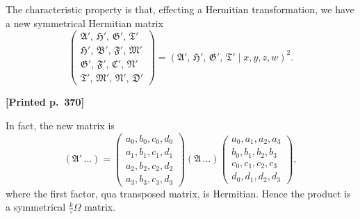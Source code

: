 \documentclass[11pt]{article}
\begin{document}
The characteristic property is that, effecting a Hermitian transformation, we have a new symmetrical Hermitian matrix
\[
\begin{pmatrix}\mathfrak{A}',\,\mathfrak{H}',\,\mathfrak{G}',\,\mathfrak{T}'\\ \mathfrak{H}',\,\mathfrak{B}',\,\mathfrak{F}',\,\mathfrak{M}'\\ \mathfrak{G}',\,\mathfrak{F}',\,\mathfrak{C}',\,\mathfrak{N}'\\ \mathfrak{T}',\,\mathfrak{M}',\,\mathfrak{N}',\,\mathfrak{D}'\end{pmatrix}
=(\mathfrak{A}',\,\mathfrak{H}',\,\mathfrak{G}',\,\mathfrak{T}' \mid x,y,z,w)^{2}.
\]

\medskip
\noindent\textbf{[Printed p.~370]}\hfill

\medskip
In fact, the new matrix is
\[
(\mathfrak{A}'\,\ldots)=\begin{pmatrix}a_{0},b_{0},c_{0},d_{0}\\ a_{1},b_{1},c_{1},d_{1}\\ a_{2},b_{2},c_{2},d_{2}\\ a_{3},b_{3},c_{3},d_{3}\end{pmatrix}(\mathfrak{A}\,\ldots)\begin{pmatrix}a_{0},a_{1},a_{2},a_{3}\\ b_{0},b_{1},b_{2},b_{3}\\ c_{0},c_{1},c_{2},c_{3}\\ d_{0},d_{1},d_{2},d_{3}\end{pmatrix},
\]
where the first factor, qua transposed matrix, is Hermitian. Hence the product is a symmetrical $\frac{k}{\square}\Omega$ matrix.
\end{document}
